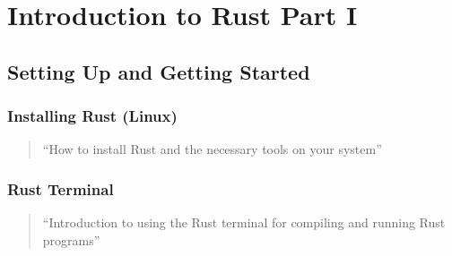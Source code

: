 \chapter{Introduction to Rust Part I}
\section{Setting Up and Getting Started}
\subsection{Installing Rust (Linux)}
\begin{quote}
``How to install Rust and the necessary tools on your system''
\end{quote}

\newpage
\subsection{Rust Terminal}
\begin{quote}
``Introduction to using the Rust terminal for compiling and running Rust programs''
\end{quote}

